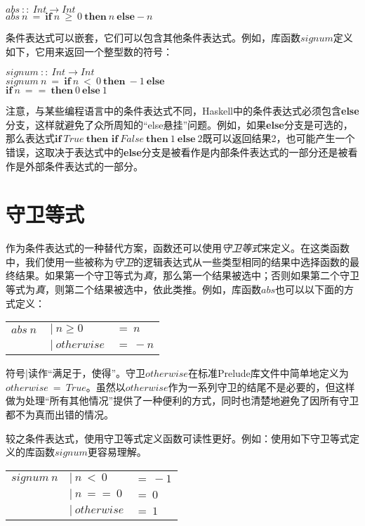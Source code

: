 \noindent\hspace*{1cm}$abs~::~Int \rightarrow Int$\\
\hspace*{1cm}$abs~n~=~\textbf{if}~n~ \geq ~0~ \textbf{then}~n~ \textbf{else} -n $

条件表达式可以嵌套，它们可以包含其他条件表达式。例如，库函数$signum$定义如下，它用来返回一个整型数的符号：

\noindent\hspace*{1cm}$signum~::~Int \rightarrow Int$\\
\hspace*{1cm}$signum~n~=~\textbf{if}~n~<~0~\textbf{then}~-1~\textbf{else} $\\
\hspace*{4cm}$\textbf{if}~n~==~\textbf{then}~0~\textbf{else}~1$

注意，与某些编程语言中的条件表达式不同，Haskell中的条件表达式必须包含\textbf{else}分支，这样就避免了众所周知的“else悬挂”问题。例如，如果\textbf{else}分支是可选的，那么表达式$\textbf{if}~True~\textbf{then~if}~False~\textbf{then}~1~\textbf{else}~2$既可以返回结果2，也可能产生一个错误，这取决于表达式中的\textbf{else}分支是被看作是内部条件表达式的一部分还是被看作是外部条件表达式的一部分。

\section{守卫等式}
作为条件表达式的一种替代方案，函数还可以使用\textit{守卫等式}来定义。在这类函数中，我们使用一些被称为\textit{守卫}的逻辑表达式从一些类型相同的结果中选择函数的最终结果。如果第一个守卫等式为\textit{真}，那么第一个结果被选中；否则如果第二个守卫等式为\textit{真}，则第二个结果被选中，依此类推。例如，库函数$abs$也可以以下面的方式定义： 

\begin{tabular}[t]{lll}
$abs~n~$&$|~n\geq 0$&$= ~ n$\\
&$|~otherwise$&$=~-n$\\
\end{tabular}

符号|读作“满足于，使得”。守卫$otherwise$在标准Prelude库文件中简单地定义为$otherwise~=~True$。虽然以$otherwise$作为一系列守卫的结尾不是必要的，但这样做为处理“所有其他情况”提供了一种便利的方式，同时也清楚地避免了因所有守卫都不为真而出错的情况。

较之条件表达式，使用守卫等式定义函数可读性更好。例如：使用如下守卫等式定义的库函数$signum$更容易理解。

\begin{tabular}[t]{lll}
$signum~n$&$|~n~<~0$&$=~-1$\\
&$|~n~==~0$&$=~0$\\
&$|~otherwise$&$=~1$\\
\end{tabular}

